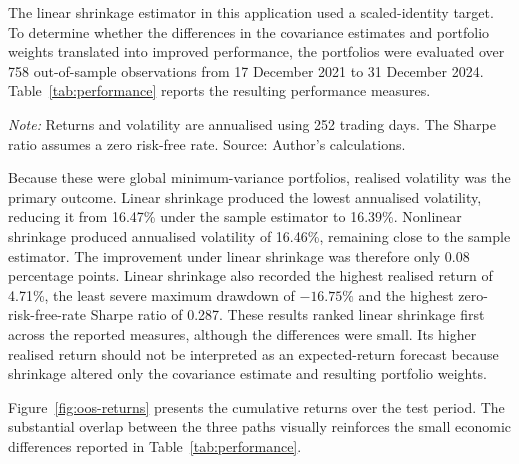 The linear shrinkage estimator in this application used a scaled-identity target. To determine whether the differences in the covariance estimates and portfolio weights translated into improved performance, the portfolios were evaluated over 758 out-of-sample observations from 17 December 2021 to 31 December 2024. Table~\ref{tab:performance} reports the resulting performance measures.

\begin{table}[htbp]
\centering
\caption{Out-of-sample portfolio performance}
\label{tab:performance}
\small
{}

\parbox{\textwidth}{\footnotesize
\textit{Note:} Returns and volatility are annualised using 252 trading
days. The Sharpe ratio assumes a zero risk-free rate. Source: Author's
calculations.
}
\end{table}

Because these were global minimum-variance portfolios, realised volatility was the primary outcome. Linear shrinkage produced the lowest annualised volatility, reducing it from 16.47\% under the sample estimator to 16.39\%. Nonlinear shrinkage produced annualised volatility of 16.46\%, remaining close to the sample estimator. The improvement under linear shrinkage was therefore only 0.08 percentage points. Linear shrinkage also recorded the highest realised return of 4.71\%, the least severe maximum drawdown of $-16.75\%$ and the highest zero-risk-free-rate Sharpe ratio of 0.287. These results ranked linear shrinkage first across the reported measures, although the differences were small. Its higher realised return should not be interpreted as an expected-return forecast because shrinkage altered only the covariance estimate and resulting portfolio weights.

Figure~\ref{fig:oos-returns} presents the cumulative returns over the test period. The substantial overlap between the three paths visually reinforces the small economic differences reported in Table~\ref{tab:performance}.

